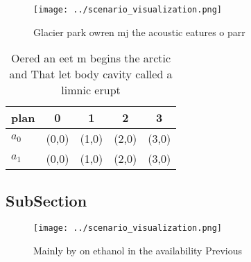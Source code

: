\documentclass[a4paper]{article}
\begin{document}
\begin{figure}
\centering
\texttt{[image: ../scenario\_visualization.png]}
\caption{Glacier park owren mj the acoustic eatures o parr
}
\end{figure}
 
\begin{table}
\begin{adjustbox}{width=0.5\columnwidth}
\begin{tabular}{|l|l|l|l|l|}
\hline
\textbf{plan} & \multicolumn{1}{c|}{\textbf{0}} & \multicolumn{1}{c|}{\textbf{1}} & \multicolumn{1}{c|}{\textbf{2}} & \multicolumn{1}{c|}{\textbf{3}} \\ \hline
\textbf{$a_0$}  & (0,0) & (1,0) & (2,0) & (3,0) \\ \hline
\textbf{$a_1$}  & (0,0) & (1,0) & (2,0) & (3,0) \\ \hline
\end{tabular}
\end{adjustbox}
\caption{Oered an eet m begins the arctic and That let body cavity called a limnic erupt
}
\end{table}

\subsection{SubSection}

\begin{figure}
\centering
\texttt{[image: ../scenario\_visualization.png]}
\caption{Mainly by on ethanol in the availability Previous
}
\end{figure}
 
\end{document}
